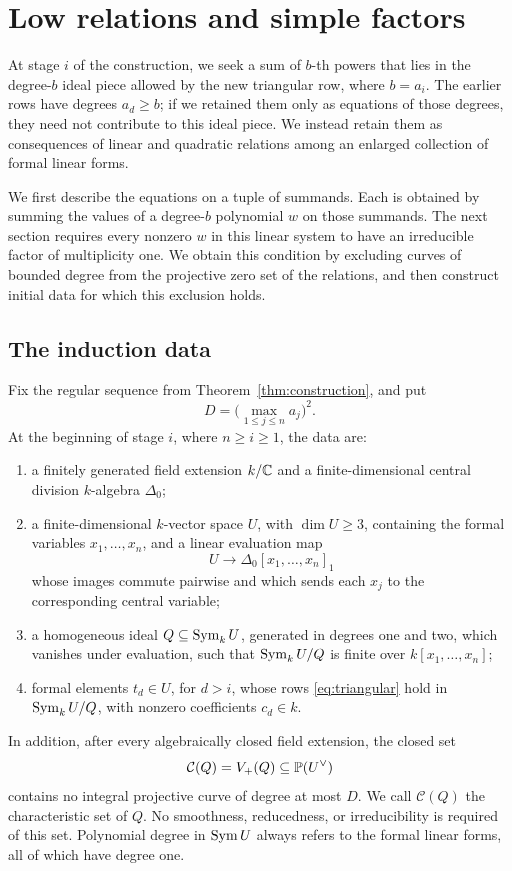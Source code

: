 \section{Low relations and simple factors}\label{sec:low-relations}

At stage \(i\) of the construction, we seek a sum of \(b\)-th powers
that lies in the degree-\(b\) ideal piece allowed by the new triangular
row, where \(b=a_i\). The earlier rows have degrees \(a_d\ge b\);
if we retained them only as equations of those degrees, they need not
contribute to this ideal piece. We instead retain them as consequences
of linear and quadratic relations among an enlarged collection of
formal linear forms.

We first describe the equations on a tuple of summands. Each is obtained
by summing the values of a degree-\(b\) polynomial \(w\) on those
summands. The next section requires every nonzero \(w\) in this linear
system to have an irreducible factor of multiplicity one.
We obtain this condition by excluding curves of bounded degree from
the projective zero set of the relations, and then construct initial
data for which this exclusion holds.

\subsection{The induction data}

Fix the regular sequence from Theorem~\ref{thm:construction}, and put
\[
 D=\bigl(\max_{1\le j\le n}a_j\bigr)^2.
\]
At the beginning of stage \(i\), where \(n\ge i\ge1\), the data are:
\begin{enumerate}[label=\textup{(\roman*)}]
\item a finitely generated field extension \(k/\mathbb C\) and a
finite-dimensional central division \(k\)-algebra \(\Delta_0\);
\item a finite-dimensional \(k\)-vector space \(U\), with
\(\dim U\ge3\), containing the formal variables \(x_1,\ldots,x_n\),
and a linear evaluation map
\[
 U\longrightarrow\Delta_0[x_1,\ldots,x_n]_1
\]
whose images commute pairwise and which sends each \(x_j\) to the
corresponding central variable;
\item a homogeneous ideal \(Q\subseteq\operatorname{Sym}_k U\), generated in
degrees one and two, which vanishes under evaluation, such that
\(\operatorname{Sym}_k U/Q\) is finite over \(k[x_1,\ldots,x_n]\);
\item formal elements \(t_d\in U\), for \(d>i\), whose rows
\eqref{eq:triangular} hold in \(\operatorname{Sym}_k U/Q\), with nonzero
coefficients \(c_d\in k\).
\end{enumerate}
In addition, after every algebraically closed field extension, the
closed set
\[
 \mathcal C(Q)=V_+(Q)\subseteq\mathbb P(U^\vee)
\]
contains no integral projective curve of degree at most \(D\).
We call \(\mathcal C(Q)\) the characteristic set of \(Q\).
No smoothness, reducedness, or irreducibility is required of this set.
Polynomial degree in \(\operatorname{Sym} U\) always refers to the formal linear
forms, all of which have degree one.

